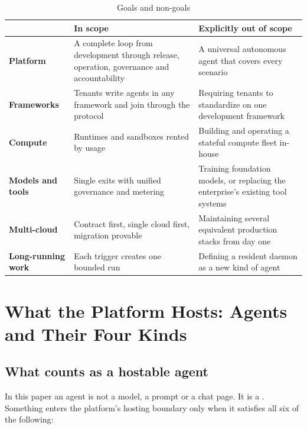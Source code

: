 \begin{table}[htbp]
\centering
\caption{Goals and non-goals}
\label{tab:goals}
\begin{tabularx}{\textwidth}{@{}>{\bfseries}L{2.4cm}YY@{}}
  \toprule
  & \textbf{In scope} & \textbf{Explicitly out of scope}\\
  \midrule
  Platform & A complete loop from development through release, operation, governance and accountability & A universal autonomous agent that covers every scenario\\
  Frameworks & Tenants write agents in any framework and join through the protocol & Requiring tenants to standardize on one development framework\\
  Compute & Runtimes and sandboxes rented by usage & Building and operating a stateful compute fleet in-house\\
  Models and tools & Single exits with unified governance and metering & Training foundation models, or replacing the enterprise's existing tool systems\\
  Multi-cloud & Contract first, single cloud first, migration provable & Maintaining several equivalent production stacks from day one\\
  Long-running work & Each trigger creates one bounded run & Defining a resident daemon as a new kind of agent\\
  \bottomrule
\end{tabularx}
\end{table}

\section{What the Platform Hosts: Agents and Their Four Kinds}
\label{sec:agent-def}

\subsection{What counts as a hostable agent}

In this paper an agent is not a model, a prompt or a chat page. It is a . Something enters the platform's hosting boundary only when it satisfies all six of the following:

